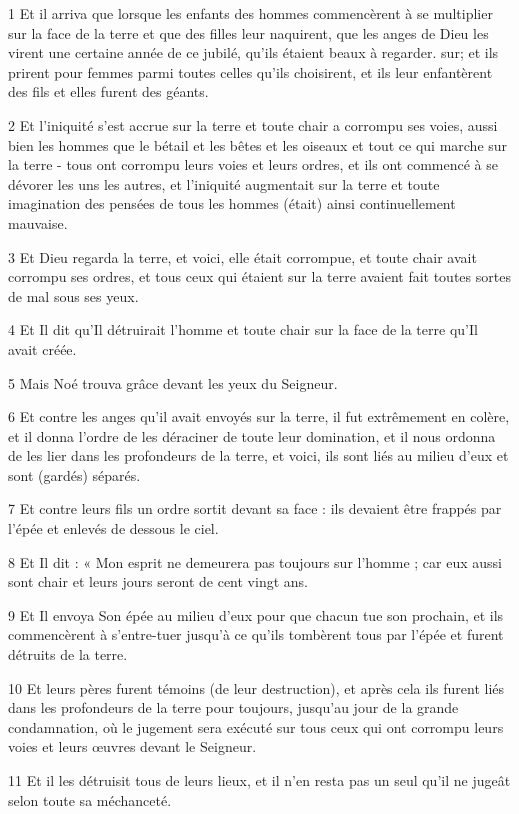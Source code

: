 \par 1 Et il arriva que lorsque les enfants des hommes commencèrent à se multiplier sur la face de la terre et que des filles leur naquirent, que les anges de Dieu les virent une certaine année de ce jubilé, qu'ils étaient beaux à regarder. sur; et ils prirent pour femmes parmi toutes celles qu'ils choisirent, et ils leur enfantèrent des fils et elles furent des géants.
\par 2 Et l'iniquité s'est accrue sur la terre et toute chair a corrompu ses voies, aussi bien les hommes que le bétail et les bêtes et les oiseaux et tout ce qui marche sur la terre - tous ont corrompu leurs voies et leurs ordres, et ils ont commencé à se dévorer les uns les autres, et l'iniquité augmentait sur la terre et toute imagination des pensées de tous les hommes (était) ainsi continuellement mauvaise.
\par 3 Et Dieu regarda la terre, et voici, elle était corrompue, et toute chair avait corrompu ses ordres, et tous ceux qui étaient sur la terre avaient fait toutes sortes de mal sous ses yeux.
\par 4 Et Il dit qu'Il détruirait l'homme et toute chair sur la face de la terre qu'Il avait créée.
\par 5 Mais Noé trouva grâce devant les yeux du Seigneur.
\par 6 Et contre les anges qu'il avait envoyés sur la terre, il fut extrêmement en colère, et il donna l'ordre de les déraciner de toute leur domination, et il nous ordonna de les lier dans les profondeurs de la terre, et voici, ils sont liés au milieu d'eux et sont (gardés) séparés.
\par 7 Et contre leurs fils un ordre sortit devant sa face : ils devaient être frappés par l'épée et enlevés de dessous le ciel.
\par 8 Et Il dit : « Mon esprit ne demeurera pas toujours sur l'homme ; car eux aussi sont chair et leurs jours seront de cent vingt ans.
\par 9 Et Il envoya Son épée au milieu d'eux pour que chacun tue son prochain, et ils commencèrent à s'entre-tuer jusqu'à ce qu'ils tombèrent tous par l'épée et furent détruits de la terre.
\par 10 Et leurs pères furent témoins (de leur destruction), et après cela ils furent liés dans les profondeurs de la terre pour toujours, jusqu'au jour de la grande condamnation, où le jugement sera exécuté sur tous ceux qui ont corrompu leurs voies et leurs œuvres devant le Seigneur.
\par 11 Et il les détruisit tous de leurs lieux, et il n'en resta pas un seul qu'il ne jugeât selon toute sa méchanceté.
